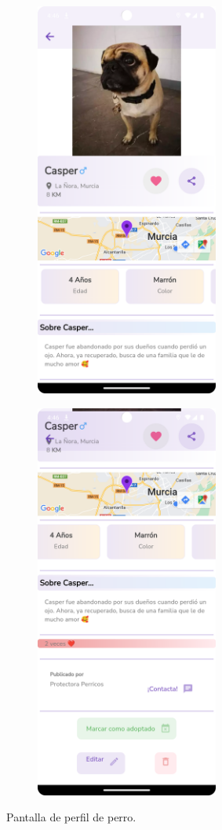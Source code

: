 \documentclass[a4paper, 12pt]{article}
\begin{document}
\begin{figure}[H]
   	\begin{subfigure}{0.48\textwidth}
		\begin{center}
			{\includegraphics[width=6cm]{app/DogProfile1.png}\par}
		\end{center}  
	\end{subfigure}\hfill
   	\begin{subfigure}{0.48\textwidth}
		\begin{center}
			{\includegraphics[width=6cm]{app/DogProfile2.png}\par}
		\end{center}  
	\end{subfigure}\hfill
	\caption{Pantalla de perfil de perro.}
\end{figure}
\end{document}

